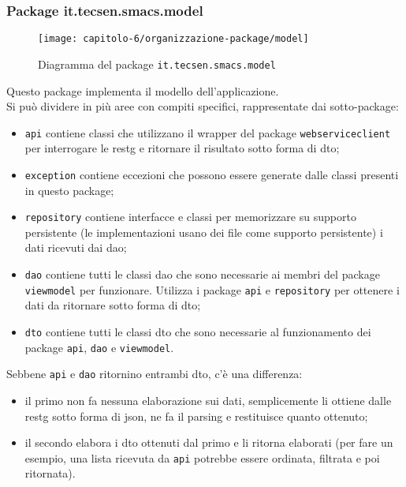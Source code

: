 \subsubsection{Package it.tecsen.smacs.model}
\label{subsubsec:it-tecsen-smacs-model}

\begin{figure}[!h]
  \centering 
  \texttt{[image: capitolo-6/organizzazione-package/model]} 
  \caption{Diagramma del package \texttt{it.tecsen.smacs.model}}
\end{figure}
Questo package implementa il modello dell'applicazione.\\
Si può dividere in più aree con compiti specifici, rappresentate dai sotto-package:
\begin{itemize}
  \item \texttt{api} contiene classi che utilizzano il wrapper del package \texttt{webserviceclient} per interrogare le \gls{restg} e ritornare il risultato sotto forma di \gls{dto};
  \item \texttt{exception} contiene eccezioni che possono essere generate dalle classi presenti in questo package;
  \item \texttt{repository} contiene interfacce e classi per memorizzare su supporto persistente (le implementazioni usano dei file come supporto persistente) i dati ricevuti dai \gls{dao};
  \item \texttt{dao} contiene tutti le classi \gls{dao} che sono necessarie ai membri del package \texttt{viewmodel} per funzionare. Utilizza i package \texttt{api} e \texttt{repository} per ottenere i dati da ritornare sotto forma di \gls{dto};
  \item \texttt{dto} contiene tutti le classi \gls{dto} che sono necessarie al funzionamento dei package \texttt{api}, \texttt{dao} e \texttt{viewmodel}.
\end{itemize}
Sebbene \texttt{api} e \texttt{dao} ritornino entrambi \gls{dto}, c'è una differenza:
\begin{itemize}
  \item il primo non fa nessuna elaborazione sui dati, semplicemente li ottiene dalle \gls{restg} sotto forma di \gls{json}, ne fa il parsing e restituisce quanto ottenuto;
  \item il secondo elabora i \gls{dto} ottenuti dal primo e li ritorna elaborati (per fare un esempio, una lista ricevuta da \texttt{api} potrebbe essere ordinata, filtrata e poi ritornata).
\end{itemize}